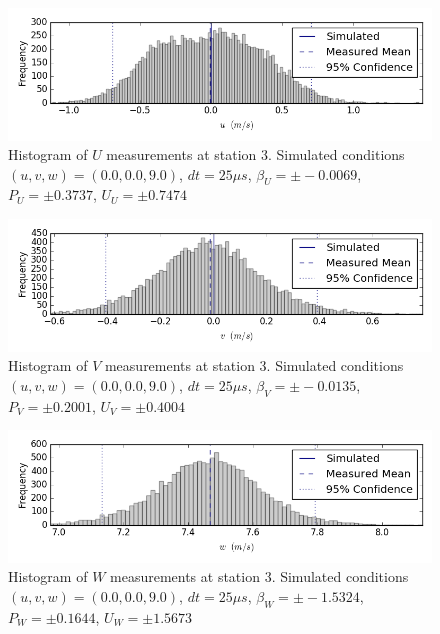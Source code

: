 \begin{figure}[H]
\centering
\includegraphics[width=6in]{figs/Ely_May28th03003/uncertainty_Ely_May28th03003_U}
\caption{Histogram of $U$ measurements at station 3. Simulated conditions $(u,v,w)=(0.0, 0.0, 9.0)$, $dt=25 \mu s$, $\beta_U=\pm -0.0069$, $P_U=\pm 0.3737$, $U_U=\pm 0.7474$}
\label{fig:uncertainty_Ely_May28th03003_U}
\end{figure}


\begin{figure}[H]
\centering
\includegraphics[width=6in]{figs/Ely_May28th03003/uncertainty_Ely_May28th03003_V}
\caption{Histogram of $V$ measurements at station 3. Simulated conditions $(u,v,w)=(0.0, 0.0, 9.0)$, $dt=25 \mu s$, $\beta_V=\pm -0.0135$, $P_V=\pm 0.2001$, $U_V=\pm 0.4004$}
\label{fig:uncertainty_Ely_May28th03003_V}
\end{figure}


\begin{figure}[H]
\centering
\includegraphics[width=6in]{figs/Ely_May28th03003/uncertainty_Ely_May28th03003_W}
\caption{Histogram of $W$ measurements at station 3. Simulated conditions $(u,v,w)=(0.0, 0.0, 9.0)$, $dt=25 \mu s$, $\beta_W=\pm -1.5324$, $P_W=\pm 0.1644$, $U_W=\pm 1.5673$}
\label{fig:uncertainty_Ely_May28th03003_W}
\end{figure}


